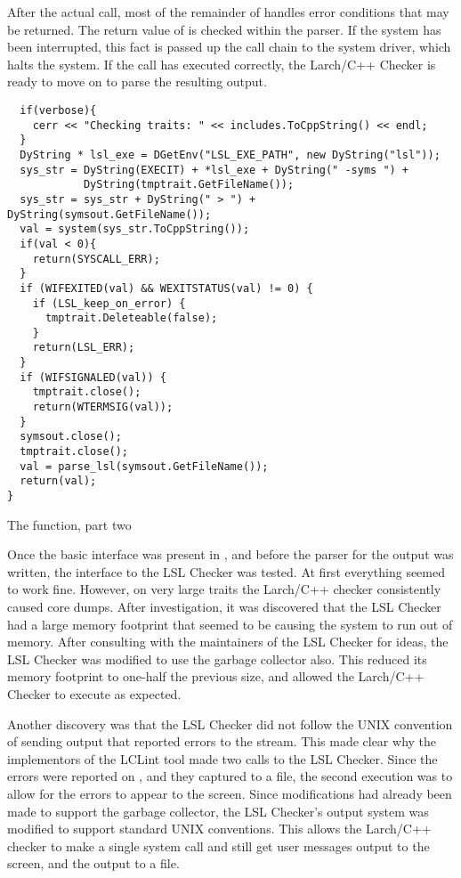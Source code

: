 After the actual  call, most of the remainder of
 handles error conditions that may be
returned. The return value of  is checked within
the parser. If the system has been interrupted, this fact is passed up
the call chain to the system driver, which halts the system. If the
 call has executed correctly, the Larch/C++ Checker
is ready to move on to parse the resulting  output.

\begin{BFIGURE}
\begin{verbatim}
  if(verbose){
    cerr << "Checking traits: " << includes.ToCppString() << endl;
  }
  DyString * lsl_exe = DGetEnv("LSL_EXE_PATH", new DyString("lsl"));
  sys_str = DyString(EXECIT) + *lsl_exe + DyString(" -syms ") +
            DyString(tmptrait.GetFileName());
  sys_str = sys_str + DyString(" > ") + DyString(symsout.GetFileName());
  val = system(sys_str.ToCppString());
  if(val < 0){
    return(SYSCALL_ERR);
  }
  if (WIFEXITED(val) && WEXITSTATUS(val) != 0) {
    if (LSL_keep_on_error) {
      tmptrait.Deleteable(false);
    }
    return(LSL_ERR);
  }
  if (WIFSIGNALED(val)) {
    tmptrait.close();
    return(WTERMSIG(val));
  }
  symsout.close();
  tmptrait.close();
  val = parse_lsl(symsout.GetFileName());
  return(val);
}
\end{verbatim}
\caption{The  function, part two}
\label{calllsl2}
\end{BFIGURE}

Once the basic interface was present in , and
before the parser for the
 output was written, the
interface to the LSL Checker was tested. At first everything seemed to
work fine. However, on very large traits the Larch/C++ checker consistently
caused core dumps. After investigation, it was discovered that the LSL
Checker had a large memory footprint that seemed to be causing the
system to run out of memory. After consulting with the maintainers of
the LSL Checker for ideas, the LSL Checker was modified to use the
garbage collector also. This reduced its memory footprint to one-half
the previous size, and allowed the Larch/C++ Checker to execute as
expected. 

Another discovery was that the LSL Checker did not follow
the UNIX convention of sending output that reported errors to the
 stream. This made clear why the implementors of the
LCLint tool made two calls to the LSL Checker. Since the errors were
reported on , and they captured  to
a file, the second execution was to allow for the errors to appear to
the screen. Since modifications had already been made to support the
garbage collector, the LSL Checker's output system was modified to
support standard UNIX conventions. This allows the Larch/C++ checker
to make a single system call and still get user messages output to
the screen, and the  output to a file.

